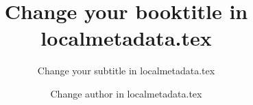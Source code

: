 
\title{Change your booktitle in localmetadata.tex}  %
\subtitle{Change your subtitle in localmetadata.tex}
\author{Change author in localmetadata.tex}
\renewcommand{\lsISBNdigital}{978-3-944675-56-5}
\renewcommand{\lsISBNhardcover}{978-3-944675-54-1}
\renewcommand{\lsISBNsoftcover}{978-3-944675-55-8}
